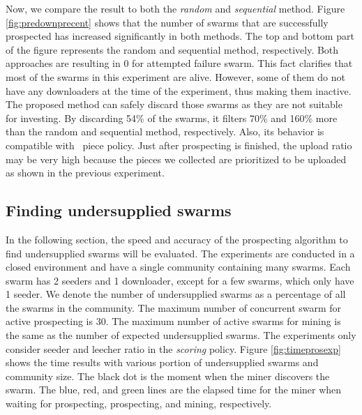Now, we compare the result to both the \textit{random} and \textit{sequential} method. Figure \ref{fig:predownprecent} shows that the number of swarms that are successfully prospected has increased significantly in both methods. The top and bottom part of the figure represents the random and sequential method, respectively. Both approaches are resulting in 0 for attempted failure swarm. This fact clarifies that most of the swarms in this experiment are alive. However, some of them do not have any downloaders at the time of the experiment, thus making them inactive. The proposed method can safely discard those swarms as they are not suitable for investing. By discarding 54\% of the swarms, it filters 70\% and 160\% more than the random and sequential method, respectively. Also, its behavior is compatible with \bt~piece policy. Just after prospecting is finished, the upload ratio may be very high because the pieces we collected are prioritized to be uploaded as shown in the previous experiment.

\subsection{Finding undersupplied swarms}
In the following section, the speed and accuracy of the prospecting algorithm to find undersupplied swarms will be evaluated. The experiments are conducted in a closed environment and have a single community containing many swarms. Each swarm has 2 seeders and 1 downloader, except for a few swarms, which only have 1 seeder. We denote the number of undersupplied swarms as a percentage of all the swarms in the community. The maximum number of concurrent swarm for active prospecting is 30. The maximum number of active swarms for mining is the same as the number of expected undersupplied swarms. The experiments only consider seeder and leecher ratio in the \textit{scoring} policy. Figure \ref{fig:timeprosexp} shows the time results with various portion of undersupplied swarms and community size. The black dot is the moment when the miner discovers the swarm. The blue, red, and green lines are the elapsed time for the miner when waiting for prospecting, prospecting, and mining, respectively.

